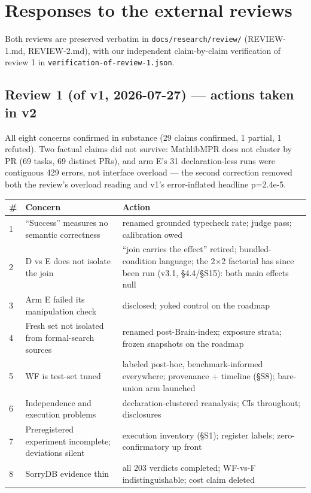 \documentclass[10pt]{article}
\newcommand{\code}[1]{\texttt{#1}}
\begin{document}
\section{Responses to the external reviews}\label{s12}

Both reviews are preserved verbatim in \code{docs/research/review/}
(REVIEW-1.md, REVIEW-2.md), with our independent claim-by-claim
verification of review 1 in \code{verification-of-review-1.json}.

\subsection{Review 1 (of v1, 2026-07-27) --- actions taken in v2}
\label{s12:r1}

All eight concerns confirmed in substance (29 claims confirmed, 1
partial, 1 refuted). Two factual claims did not survive: MathlibMPR
does not cluster by PR (69 tasks, 69 distinct PRs), and arm E's 31
declaration-less runs were contiguous 429 errors, not interface
overload --- the second correction removed both the review's overload
reading and v1's error-inflated headline p=2.4e-5.

\begin{center}\footnotesize
\begin{tabular}{@{}p{}p{}p{}@{}}
\toprule
\# & Concern & Action \\
\midrule
1 & ``Success'' measures no semantic correctness & renamed grounded typecheck rate; judge pass; calibration owed \\
2 & D vs E does not isolate the join & ``join carries the effect'' retired; bundled-condition language; the 2$\times$2 factorial has since been run (v3.1, \S 4.4/\S S15): both main effects null \\
3 & Arm E failed its manipulation check & disclosed; yoked control on the roadmap \\
4 & Fresh set not isolated from formal-search sources & renamed post-Brain-index; exposure strata; frozen snapshots on the roadmap \\
5 & WF is test-set tuned & labeled post-hoc, benchmark-informed everywhere; provenance + timeline (\S S8); bare-union arm launched \\
6 & Independence and execution problems & declaration-clustered reanalysis; CIs throughout; disclosures \\
7 & Preregistered experiment incomplete; deviations silent & execution inventory (\S S1); register labels; zero-confirmatory up front \\
8 & SorryDB evidence thin & all 203 verdicts completed; WF-vs-F indistinguishable; cost claim deleted \\
\bottomrule
\end{tabular}
\end{center}
\end{document}
